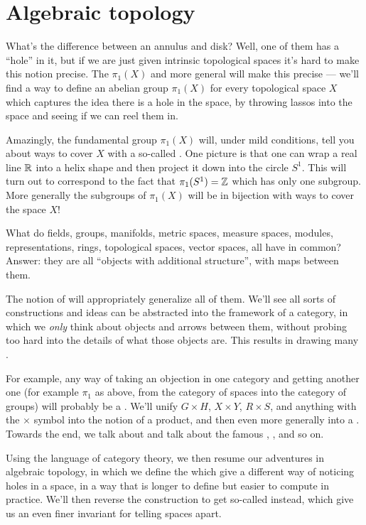 \section{Algebraic topology}
\begin{itemize}
What's the difference between an annulus and disk?
Well, one of them has a ``hole'' in it,
but if we are just given intrinsic topological spaces
it's hard to make this notion precise.
The  $\pi_1(X)$
and more general 
will make this precise --- we'll find a way to define an abelian group
$\pi_1(X)$ for every topological space $X$ which captures the idea
there is a hole in the space, by throwing lassos into the space
and seeing if we can reel them in.

Amazingly, the fundamental group $\pi_1(X)$ will, under mild conditions,
tell you about ways to cover $X$ with a so-called
.
One picture is that one can wrap a real line $\mathbb R$ into a helix shape
and then project it down into the circle $S^1$.
This will turn out to correspond to the fact that $\pi_1(S^1) = \mathbb Z$
which has only one subgroup.
More generally the subgroups of $\pi_1(X)$ will be in
bijection with ways to cover the space $X$!

What do fields, groups, manifolds, metric spaces, measure spaces,
modules, representations, rings, topological spaces, vector spaces,
all have in common?
Answer: they are all ``objects with additional structure'',
with maps between them.

The notion of  will appropriately generalize all of them.
We'll see all sorts of constructions and ideas
can be abstracted into the framework of a category,
in which we \emph{only} think about objects and arrows between them,
without probing too hard into the details of what those objects are.
This results in drawing many .

For example, any way of taking an objection in one category
and getting another one (for example $\pi_1$ as above,
from the category of spaces into the category of groups)
will probably be a .
We'll unify $G \times H$, $X \times Y$, $R \times S$,
and anything with the $\times$ symbol into the notion of a product,
and then even more generally into a .
Towards the end, we talk about 
and talk about the famous
, , and so on.

Using the language of category theory,
we then resume our adventures in algebraic topology,
in which we define the 
which give a different way of noticing holes in a space,
in a way that is longer to define but easier to compute in practice.
We'll then reverse the construction to get so-called
 instead,
which give us an even finer invariant for telling spaces apart.
\end{itemize}

